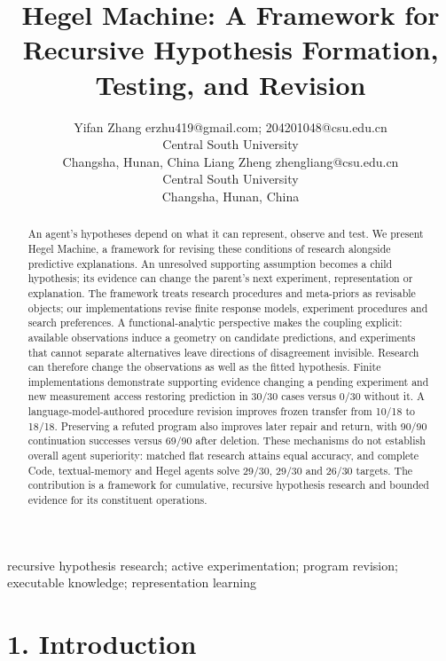 \documentclass[twoside,11pt]{article}
\author{\name Yifan Zhang \email erzhu419@gmail.com; 204201048@csu.edu.cn\\
\addr Central South University\\
Changsha, Hunan, China
\AND
\name Liang Zheng \email zhengliang@csu.edu.cn\\
\addr Central South University\\
Changsha, Hunan, China}
\date{}
\begin{document}
\title{Hegel Machine: A Framework for Recursive Hypothesis Formation, Testing, and Revision}
\maketitle
\thispagestyle{empty}

\begin{abstract}

An agent's hypotheses depend on what it can represent, observe and test. We present Hegel Machine, a framework for revising these conditions of research alongside predictive explanations. An unresolved supporting assumption becomes a child hypothesis; its evidence can change the parent's next experiment, representation or explanation. The framework treats research procedures and meta-priors as revisable objects; our implementations revise finite response models, experiment procedures and search preferences. A functional-analytic perspective makes the coupling explicit: available observations induce a geometry on candidate predictions, and experiments that cannot separate alternatives leave directions of disagreement invisible. Research can therefore change the observations as well as the fitted hypothesis. Finite implementations demonstrate supporting evidence changing a pending experiment and new measurement access restoring prediction in 30/30 cases versus 0/30 without it. A language-model-authored procedure revision improves frozen transfer from 10/18 to 18/18. Preserving a refuted program also improves later repair and return, with 90/90 continuation successes versus 69/90 after deletion. These mechanisms do not establish overall agent superiority: matched flat research attains equal accuracy, and complete Code, textual-memory and Hegel agents solve 29/30, 29/30 and 26/30 targets. The contribution is a framework for cumulative, recursive hypothesis research and bounded evidence for its constituent operations.


\end{abstract}

\begin{keywords}
recursive hypothesis research; active experimentation; program revision; executable knowledge; representation learning
\end{keywords}

\section*{1. Introduction}
\end{document}

